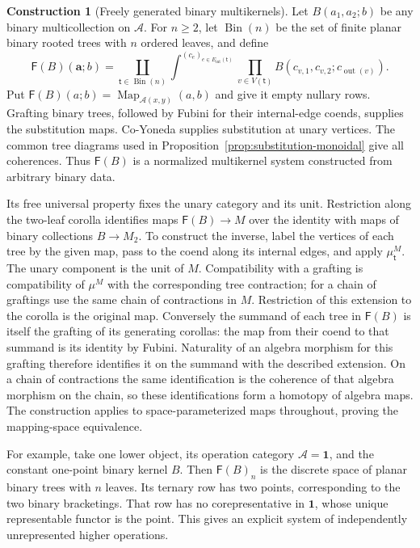 \documentclass[oneside]{article}
\theoremstyle{plain}
\theoremstyle{definition}
\newtheorem{construction}[theorem]{Construction}
\theoremstyle{remark}
\newcommand{\Map}{\operatorname{Map}}
\newcommand{\one}{\mathbf 1}
\begin{document}
\begin{construction}[Freely generated binary multikernels]
\label{con:free-binary-multikernels}
Let $B(a_1,a_2;b)$ be any binary multicollection on $\mathcal A$.
For $n\geq2$, let $\operatorname{Bin}(n)$ be the set of finite planar
binary rooted trees with $n$ ordered leaves, and define
\[
 \mathsf F(B)(\mathbf a;b)
 =
 \coprod_{\mathsf t\in\operatorname{Bin}(n)}
 \int^{(c_e)_{e\in E_{\mathrm{int}}(\mathsf t)}}
 \prod_{v\in V(\mathsf t)}
 B(c_{v,1},c_{v,2};c_{\operatorname{out}(v)}).
\]
Put $\mathsf F(B)(a;b)=\Map_{\mathcal A(x,y)}(a,b)$ and give it
empty nullary rows. Grafting binary trees, followed by Fubini for
their internal-edge coends, supplies the substitution maps.
Co-Yoneda supplies substitution at unary vertices. The common
tree diagrams used in Proposition~\ref{prop:substitution-monoidal}
give all coherences. Thus $\mathsf F(B)$ is a normalized
multikernel system constructed from arbitrary binary data.

Its free universal property fixes the unary category and its unit.
Restriction along the two-leaf corolla identifies maps
$\mathsf F(B)\to M$ over the identity with maps of binary collections
$B\to M_2$. To construct the inverse, label the vertices of each tree
by the given map, pass to the coend along its internal edges, and
apply $\mu_{\mathsf t}^M$. The unary component is the unit of $M$.
Compatibility with a grafting is compatibility of $\mu^M$ with the
corresponding tree contraction; for a chain of graftings use the same
chain of contractions in $M$. Restriction of this extension to the
corolla is the original map. Conversely the summand of each tree in
$\mathsf F(B)$ is itself the grafting of its generating corollas:
the map from their coend to that summand is its identity by Fubini.
Naturality of an algebra morphism for this grafting therefore identifies
it on the summand with the described extension. On a chain of
contractions the same identification is the coherence of that algebra
morphism on the chain, so these identifications form a homotopy of
algebra maps. The construction applies to space-parameterized maps
throughout, proving the mapping-space equivalence.
\end{construction}

For example, take one lower object, its operation category
$\mathcal A=\one$, and the constant one-point binary kernel $B$.
Then $\mathsf F(B)_n$ is the discrete space of planar binary trees
with $n$ leaves. Its ternary row has two points, corresponding to
the two binary bracketings. That row has no corepresentative in
$\one$, whose unique representable functor is the point. This gives
an explicit system of independently unrepresented higher operations.
\end{document}
